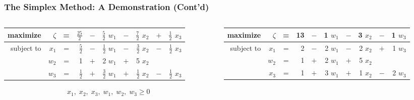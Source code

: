 \documentclass[usenames,dvipsnames,8pt]{beamer}%
\begin{document}
\begin{frame}
  \frametitle{The Simplex Method: A Demonstration (Cont'd)}
  \begin{columns}
    \begin{column}{0.5\textwidth}
      \begin{table}[ht]
        \centering
        \setlength\tabcolsep{2pt}
        \begin{tabular}{rrcrcrcrcr}
          \toprule
          maximize   &$\zeta$& = &$\frac{25}{2}$ & $-$ & $\frac{5}{2}$ $w_1$ & $-$ & $\frac{7}{2}$ $x_2$ & \cellcolor{C2}\color{white} $+$ & \cellcolor{C2}\color{white} $\frac{1}{2}$ $x_3$\\
          \midrule
          subject to & $x_1$ & = & $\frac{5}{2}$ & $-$ & $\frac{1}{2}$ $w_1$ & $-$ & $\frac{3}{2}$ $x_2$ & $-$ & $\frac{1}{2}$ $x_3$\\
                     & $w_2$ & = &   1 & $+$ & 2   $w_1$ & $+$ & 5   $x_2$ &   &  \\
                     & $w_3$ & = & $\frac{1}{2}$ & $+$ & $\frac{3}{2}$ $w_1$ & $+$ & $\frac{1}{2}$ $x_2$ & $-$ & $\frac{1}{2}$ $x_3$\\ 
          \bottomrule
        \end{tabular}
      \end{table}
      \vspace{-0.4cm}
      \begin{align*}
        x_1,\;x_2,\;x_3,\;w_1,\;w_2,\;w_3\geqslant 0
      \end{align*}
    \end{column}
    \begin{column}{0.5\textwidth}
      \begin{table}[ht]
        \centering
        \setlength\tabcolsep{2pt}
        \begin{tabular}{rrcrcrcrcr}
          \toprule
          maximize   &$\zeta$& = & 13 & $-$ & 1 $w_1$ & $-$ & 3 $x_2$ & $-$ & 1 $w_3$ \\
          \midrule
          subject to & $x_1$ & = &  2 & $-$ & 2 $w_1$ & $-$ & 2 $x_2$ & $+$ & 1 $w_3$ \\
                     & $w_2$ & = &  1 & $+$ & 2 $w_1$ & $+$ & 5 $x_2$ &   &         \\
                     & $x_3$ & = &  1 & $+$ & 3 $w_1$ & $+$ & 1 $x_2$ & $-$ & 2 $w_3$ \\ 
          \bottomrule
        \end{tabular}
      \end{table}
      \vspace{-0.4cm}

\end{column}
\end{columns}
\end{frame}
\end{document}
